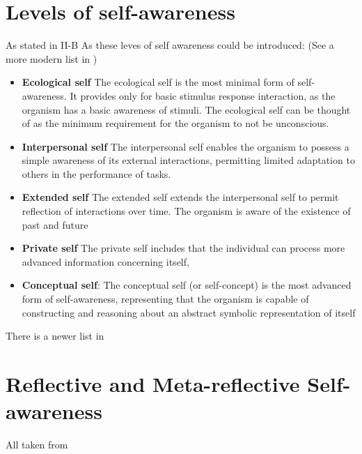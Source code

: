\documentclass{article}
\begin{document}
		\section{Levels of self-awareness}
			As stated in
			\cite{lewis-2011-a-survey-of-self-awareness-and-its-application-in-computing-systems} II-B
			As \citet{neisser-1997-the-roots-of-self-knowledge-perceiving-self-it-and-thou} these leves of self awareness could be introduced: (See a more modern list in \cite{lewis-2017-towards-a-framework-for-the-levels-and-aspects-of-self-aware-computing-systems})
			\begin{itemize}
				\item \textbf{Ecological self} The ecological self is the most minimal form of self-awareness. It provides only for basic stimulus	response interaction, as the organism has a basic awareness of stimuli. The ecological self can be thought of as the minimum requirement for the organism to not be unconscious.
				
				\item \textbf{Interpersonal self} The interpersonal self enables the organism to possess a simple awareness of its external interactions, permitting limited adaptation to others in the performance of tasks.
				
				\item \textbf{Extended self} The extended self extends the interpersonal self to permit reflection of interactions over time. The organism is aware of the existence of past and future
				
				\item \textbf{Private self} The private self includes that the individual can process more advanced information concerning itself,
				
				\item \textbf{Conceptual self}: The conceptual self (or self-concept) is the most advanced form of self-awareness, representing that
				the organism is capable of constructing and reasoning about an abstract symbolic representation of itself
			\end{itemize}
			There is a newer list in \cite{lewis-2017-towards-a-framework-for-the-levels-and-aspects-of-self-aware-computing-systems}
		\section{Reflective and Meta-reflective Self-awareness}
			All taken from \cite{lewis-2017-towards-a-framework-for-the-levels-and-aspects-of-self-aware-computing-systems}
\end{document}
